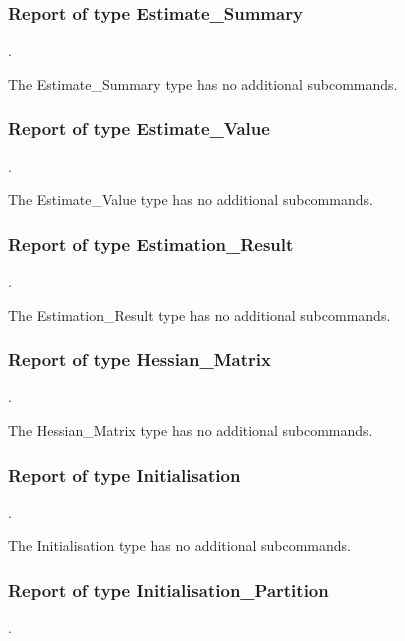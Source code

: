 
\subsubsection{Report of type Estimate\_Summary}
.
\label{syntax:Report-EstimateSummary}

The Estimate\_Summary type has no additional subcommands.
\subsubsection{Report of type Estimate\_Value}
.
\label{syntax:Report-EstimateValue}

The Estimate\_Value type has no additional subcommands.
\subsubsection{Report of type Estimation\_Result}
.
\label{syntax:Report-EstimationResult}

The Estimation\_Result type has no additional subcommands.
\subsubsection{Report of type Hessian\_Matrix}
.
\label{syntax:Report-HessianMatrix}

The Hessian\_Matrix type has no additional subcommands.
\subsubsection{Report of type Initialisation}
.
\label{syntax:Report-Initialisation}

The Initialisation type has no additional subcommands.
\subsubsection{Report of type Initialisation\_Partition}
.
\label{syntax:Report-InitialisationPartition}


